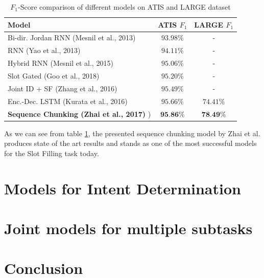 \documentclass[twoside,11pt,a4paper]{article}
\theoremstyle{break}
\begin{document}
\begin{table}[H]
	\begin{center}
		\begin{tabular}{|l|c|c|}
			\hline
			Model															&ATIS $F_1$	&LARGE $F_1$\\ \hline \hline
			Bi-dir. Jordan RNN (Mesnil et al., 2013) \cite{mesnil:2013}	&$93.98\%$	&- \\ \hline
			RNN (Yao et al., 2013) \cite{yao:2013}							&$94.11\%$	&- \\ \hline
			Hybrid RNN (Mesnil et al., 2015) \cite{mesnil:2015}			&$95.06\%$	&- \\ \hline
			Slot Gated (Goo et al., 2018) \cite{goo:2018}					&$95.20\%$	&- \\ \hline
			Joint ID + SF (Zhang et al., 2016) \cite{zhang:2016}			&$95.49\%$	&- \\ \hline
			Enc.-Dec. LSTM (Kurata et al., 2016) \cite{kurata:2016}		&$95.66\%$	&$74.41\%$ \\ \hline
			\textbf{Sequence Chunking (Zhai et al., 2017)} \cite{zhai:2017})&$\textbf{95.86\%}$	&$\textbf{78.49\%}$ \\ \hline
		\end{tabular}
		\caption{$F_1$-Score comparison of different models on ATIS and LARGE dataset}
		\label{tab:f1}
	\end{center}
\end{table}

As we can see from table \ref{tab:f1}, the presented sequence chunking model by Zhai et al. produces state of the art results and stands as one of the most successful models for the Slot Filling task today.

%
%
%
%
\section{Models for Intent Determination}

%
%
%
%
\section{Joint models for multiple subtasks}

%
%
%
%
\section{Conclusion}


\newpage
{}


\end{document}
